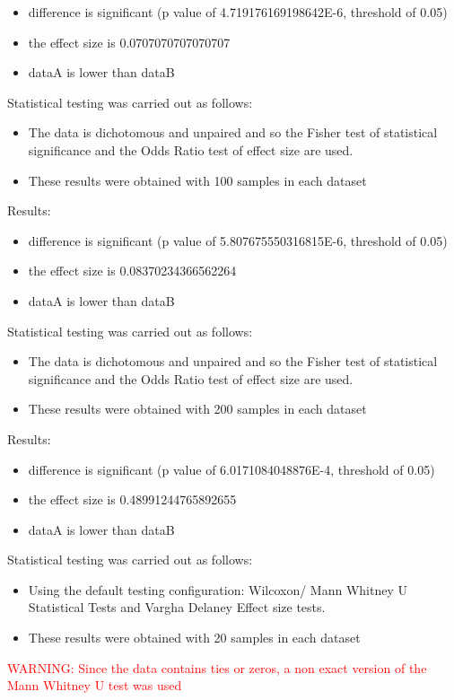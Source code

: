 \documentclass[]{article}
\begin{document}
\begin{itemize}
\item{difference is significant (p value of 4.719176169198642E-6, threshold of 0.05)}
\item{the effect size is 0.0707070707070707}
\item{dataA is lower than dataB}
\end{itemize}Statistical testing was carried out as follows: \begin{itemize}
\item{The data is dichotomous and unpaired and so the Fisher test of statistical significance and the Odds Ratio test of effect size are used.}
\item{These results were obtained with 100 samples in each dataset}
\end{itemize}Results:
\begin{itemize}
\item{difference is significant (p value of 5.807675550316815E-6, threshold of 0.05)}
\item{the effect size is 0.08370234366562264}
\item{dataA is lower than dataB}
\end{itemize}Statistical testing was carried out as follows: \begin{itemize}
\item{The data is dichotomous and unpaired and so the Fisher test of statistical significance and the Odds Ratio test of effect size are used.}
\item{These results were obtained with 200 samples in each dataset}
\end{itemize}Results:
\begin{itemize}
\item{difference is significant (p value of 6.0171084048876E-4, threshold of 0.05)}
\item{the effect size is 0.48991244765892655}
\item{dataA is lower than dataB}
\end{itemize}Statistical testing was carried out as follows: \begin{itemize}
\item{Using the default testing configuration: Wilcoxon/ Mann Whitney U Statistical Tests and Vargha Delaney Effect size tests.}
\item{These results were obtained with 20 samples in each dataset}
\end{itemize}
\textcolor{Red}{WARNING: Since the data contains ties or zeros, a non exact version of the Mann Whitney U test was used}
\end{document}
